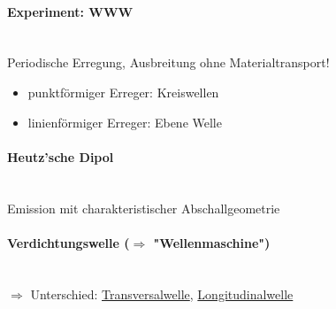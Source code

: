 \paragraph{Experiment: WWW} \hfill \\
Periodische Erregung, Ausbreitung ohne Materialtransport!
\begin{itemize}
	\item punktförmiger Erreger: Kreiswellen
	\item linienförmiger Erreger: Ebene Welle
\end{itemize}
\paragraph{Heutz'sche Dipol} \hfill \\
Emission mit charakteristischer Abschallgeometrie
\paragraph{Verdichtungswelle ($ \Rightarrow $ "Wellenmaschine")} \hfill \\
$ \Rightarrow $ Unterschied: \underline{Transversalwelle}, \underline{Longitudinalwelle}

